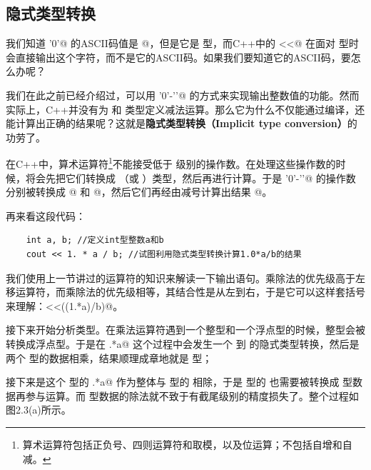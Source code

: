 \subsection*{隐式类型转换}
我们知道 \lstinline@'0'@ 的ASCII码值是 @，但是它是 \lstinline@char@ 型，而C++中的 \lstinline@cout<<@ 在面对 \lstinline@char@ 型时会直接输出这个字符，而不是它的ASCII码。如果我们要知道它的ASCII码，要怎么办呢？\par
我们在此之前已经介绍过，可以用 \lstinline@'0'-'\0'@ 的方式来实现输出整数值的功能。然而实际上，C++并没有为 \lstinline@char@ 和 \lstinline@char@ 类型定义减法运算。那么它为什么不仅能通过编译，还能计算出正确的结果呢？这就是\textbf{隐式类型转换（Implicit type conversion）}的功劳了。\par
在C++中，算术运算符\footnote{算术运算符包括正负号、四则运算符和取模，以及位运算；不包括自增和自减。}不能接受低于 \lstinline@int@ 级别的操作数。在处理这些操作数的时候，将会先把它们转换成 \lstinline@int@（或 \lstinline@unsigned@）类型，然后再进行计算。于是 \lstinline@'0'-'\0'@ 的操作数分别被转换成 @ 和 @，然后它们再经由减号计算出结果 @。\par
再来看这段代码：
\begin{lstlisting}
    int a, b; //定义int型整数a和b
    cout << 1. * a / b; //试图利用隐式类型转换计算1.0*a/b的结果
\end{lstlisting}
我们使用上一节讲过的运算符的知识来解读一下输出语句。乘除法的优先级高于左移运算符，而乘除法的优先级相等，其结合性是从左到右，于是它可以这样套括号来理解：\lstinline@cout<<((1.*a)/b)@。\par
接下来开始分析类型。在乘法运算符遇到一个整型和一个浮点型的时候，整型会被转换成浮点型。于是在 .*a@ 这个过程中会发生一个 \lstinline@int@ 到 \lstinline@double@ 的隐式类型转换，然后是两个 \lstinline@double@ 型的数据相乘，结果顺理成章地就是 \lstinline@double@ 型；\par
接下来是这个 \lstinline@double@ 型的 .*a@ 作为整体与 \lstinline@int@ 型的 \lstinline@b@ 相除，于是 \lstinline@int@ 型的 \lstinline@b@ 也需要被转换成 \lstinline@double@ 型数据再参与运算。而 \lstinline@double@ 型数据的除法就不致于有截尾级别的精度损失了。整个过程如图2.3(a)所示。\par
